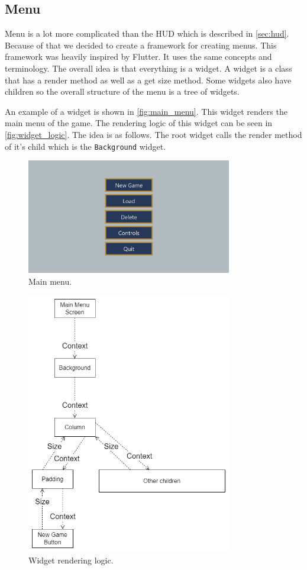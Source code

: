 \subsection*{Menu} \label{sec:menu}

Menu is a lot more complicated than the HUD which is described in \autoref*{sec:hud}.
Because of that we decided to create a framework for creating menus.
This framework was heavily inspired by Flutter.
It uses the same concepts and terminology.
The overall idea is that everything is a widget.
A widget is a class that has a render method as well as a get size method.
Some widgets also have children so the overall structure of the menu is a tree of widgets.

An example of a widget is shown in \autoref*{fig:main_menu}.
This widget renders the main menu of the game.
The rendering logic of this widget can be seen in \autoref*{fig:widget_logic}.
The idea is as follows.
The root widget calls the render method of it's child which is the \texttt{Background} widget.

\begin{figure}
    \centering
    \includegraphics[width=0.8\textwidth]{chapters/two_dimensional_graphics/resources/main-menu.png}
    \caption{Main menu.}
    \label{fig:main_menu}
\end{figure}

\begin{figure}[H]
    \centering
    \includegraphics[width=0.8\textwidth]{chapters/two_dimensional_graphics/resources/widget_logic.drawio.png}
    \caption{Widget rendering logic.}
    \label{fig:widget_logic}
\end{figure}